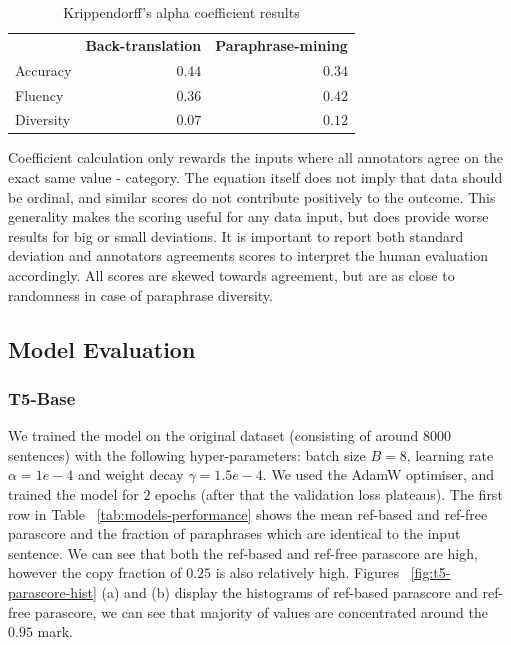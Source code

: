 \documentclass[fleqn,moreauthors,10pt]{ds_report}
\begin{document}
\begin{table}[!h]
\caption{Krippendorff's alpha coefficient results}
\begin{tabular}{lrr}
          & \multicolumn{1}{c}{\textbf{Back-translation}} & \multicolumn{1}{c}{\textbf{Paraphrase-mining}} \\
Accuracy  & $0.44$                                       & $0.34$                                              \\
Fluency   & $0.36$                                       & $0.42$                                              \\
Diversity & $0.07$                                       & $0.12$                             

\end{tabular}
\end{table} 

Coefficient calculation only rewards the inputs where all annotators agree on the exact same value - category. The equation itself does not imply that data should be ordinal, and similar scores do not contribute positively to the outcome. This generality makes the scoring useful for any data input, but does provide worse results for big or small deviations. It is important to report both standard deviation and annotators agreements scores to interpret the human evaluation accordingly. All scores are skewed towards agreement, but are as close to randomness in case of paraphrase diversity.

\subsection{Model Evaluation}


\subsubsection{T5-Base}


We trained the model on the original dataset (consisting of around $8000$ sentences) with the following hyper-parameters: batch size $B=8$, learning rate $\alpha = 1e-4$ and weight decay $\gamma = 1.5e-4$. We used the AdamW optimiser, and trained the model for $2$ epochs (after that the validation loss plateaus). The first row in Table ~\ref{tab:models-performance} shows the mean ref-based and ref-free parascore and the fraction of paraphrases which are identical to the input sentence. We can see that both the ref-based and ref-free parascore are high, however the copy fraction of $0.25$ is also relatively high. Figures ~\ref{fig:t5-parascore-hist} (a) and (b) display the histograms of ref-based parascore and ref-free parascore, we can see that majority of values are concentrated around the $0.95$ mark. 
\end{document}
